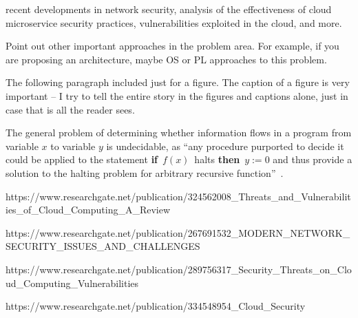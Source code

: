 recent developments in network security, analysis of the effectiveness of cloud
microservice security practices, vulnerabilities exploited in the cloud, and more.

Point out other important approaches in the problem area. For example, if you 
are proposing an architecture, maybe OS or PL approaches to this problem. 

The following paragraph included just for a figure. The caption of a figure is very
important -- I try to tell the entire story in the figures and captions alone, 
just in case that is all the reader sees.

The general problem of determining whether information flows in a program from
variable $x$ to variable $y$ is undecidable, as ``any procedure purported to
decide it could be applied to the statement {\bf if}~$f(x)$~halts {\bf then}~$y
:= 0$ and thus provide a solution to the halting problem for arbitrary
recursive function''~\cite{denning-impossible}.  

https://www.researchgate.net/publication/324562008_Threats_and_Vulnerabilities_of_Cloud_Computing_A_Review

https://www.researchgate.net/publication/267691532_MODERN_NETWORK_SECURITY_ISSUES_AND_CHALLENGES

https://www.researchgate.net/publication/289756317_Security_Threats_on_Cloud_Computing_Vulnerabilities

https://www.researchgate.net/publication/334548954_Cloud_Security
